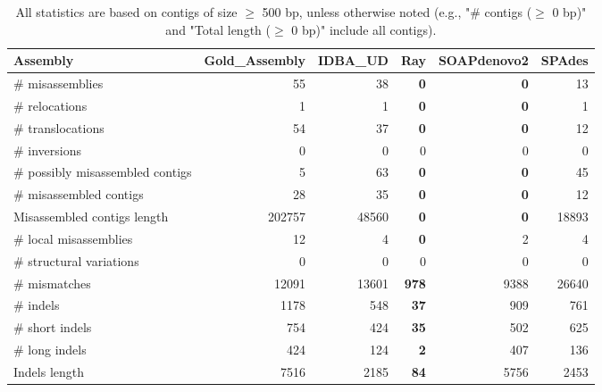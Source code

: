 \documentclass[12pt,a4paper]{article}
\begin{document}
\begin{table}[ht]
\begin{center}
\caption{All statistics are based on contigs of size $\geq$ 500 bp, unless otherwise noted (e.g., "\# contigs ($\geq$ 0 bp)" and "Total length ($\geq$ 0 bp)" include all contigs).}
\begin{tabular}{|l*{5}{|r}|}
\hline
Assembly & Gold\_Assembly & IDBA\_UD & Ray & SOAPdenovo2 & SPAdes \\ \hline
\# misassemblies & 55 & 38 & {\bf 0} & {\bf 0} & 13 \\ \hline
\hspace{5mm}\# relocations & 1 & 1 & {\bf 0} & {\bf 0} & 1 \\ \hline
\hspace{5mm}\# translocations & 54 & 37 & {\bf 0} & {\bf 0} & 12 \\ \hline
\hspace{5mm}\# inversions & 0 & 0 & 0 & 0 & 0 \\ \hline
\# possibly misassembled contigs & 5 & 63 & {\bf 0} & {\bf 0} & 45 \\ \hline
\# misassembled contigs & 28 & 35 & {\bf 0} & {\bf 0} & 12 \\ \hline
Misassembled contigs length & 202757 & 48560 & {\bf 0} & {\bf 0} & 18893 \\ \hline
\# local misassemblies & 12 & 4 & {\bf 0} & 2 & 4 \\ \hline
\# structural variations & 0 & 0 & 0 & 0 & 0 \\ \hline
\# mismatches & 12091 & 13601 & {\bf 978} & 9388 & 26640 \\ \hline
\# indels & 1178 & 548 & {\bf 37} & 909 & 761 \\ \hline
\hspace{5mm}\# short indels & 754 & 424 & {\bf 35} & 502 & 625 \\ \hline
\hspace{5mm}\# long indels & 424 & 124 & {\bf 2} & 407 & 136 \\ \hline
Indels length & 7516 & 2185 & {\bf 84} & 5756 & 2453 \\ \hline
\end{tabular}
\end{center}
\end{table}
\end{document}

